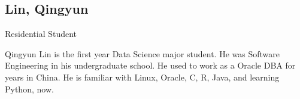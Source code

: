 \subsection{Lin, Qingyun}
	Residential Student
	
	Qingyun Lin is the first year Data Science major student. He was Software Engineering in his undergraduate school. 
	He used to work as a Oracle DBA for years in China. 
	He is familiar with Linux, Oracle, C, R, Java, and learning Python, now.



